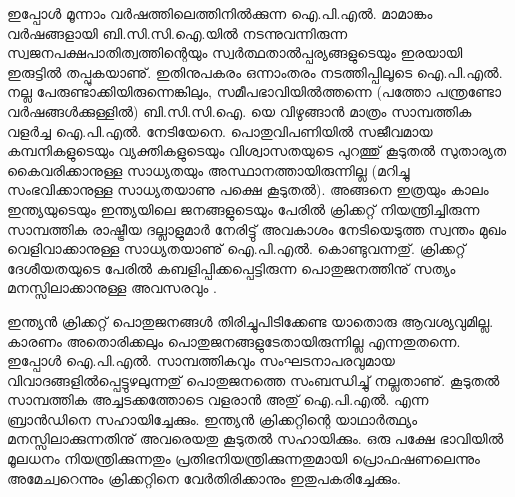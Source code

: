 ഇപ്പോള്‍ മൂന്നാം വര്‍ഷത്തിലെത്തിനില്‍ക്കുന്ന ഐ.പി.എല്‍. മാമാങ്കം വര്‍ഷങ്ങളായി ബി.സി.സി.ഐ.യില്‍ നടന്നുവന്നിരുന്ന സ്വജനപക്ഷപാതിത്വത്തിന്റെയും സ്വര്‍ത്ഥതാല്‍പ്പര്യങ്ങളുടെയും ഇരയായി ഇരുട്ടില്‍ തപ്പുകയാണു്. ഇതിനുപകരം ഒന്നാംതരം നടത്തിപ്പിലൂടെ ഐ.പി.എല്‍. നല്ല പേരുണ്ടാക്കിയിരുന്നെങ്കിലും, സമീപഭാവിയില്‍ത്തന്നെ (പത്തോ പന്ത്രണ്ടോ വര്‍ഷങ്ങള്‍ക്കുള്ളില്‍) ബി.സി.സി.ഐ. യെ വിഴുങ്ങാന്‍ മാത്രം സാമ്പത്തിക വളര്‍ച്ച ഐ.പി.എല്‍. നേടിയേനെ. പൊതുവിപണിയില്‍ സജീവമായ കമ്പനികളുടെയും വ്യക്തികളുടെയും വിശ്വാസതയുടെ പുറത്തു് കൂടുതല്‍ സുതാര്യത കൈവരിക്കാനുള്ള സാധ്യതയും അസ്ഥാനത്തായിരുന്നില്ല (മറിച്ചു സംഭവിക്കാനുള്ള സാധ്യതയാണു പക്ഷെ കൂടുതല്‍). അങ്ങനെ ഇത്രയും കാലം ഇന്ത്യയുടെയും ഇന്ത്യയിലെ ജനങ്ങളുടെയും പേരില്‍ ക്രിക്കറ്റ് നിയന്ത്രിച്ചിരുന്ന സാമ്പത്തിക രാഷ്ട്രീയ ദല്ലാളുമാര്‍ നേരിട്ടു് അവകാശം നേടിയെടുത്ത സ്വന്തം മുഖം വെളിവാക്കാനുള്ള സാധ്യതയാണു് ഐ.പി.എല്‍. കൊണ്ടുവന്നതു്. ക്രിക്കറ്റ് ദേശീയതയുടെ പേരില്‍ കബളിപ്പിക്കപ്പെട്ടിരുന്ന പൊതുജനത്തിനു് സത്യം മനസ്സിലാക്കാനുള്ള അവസരവും .

ഇന്ത്യന്‍ ക്രിക്കറ്റ് പൊതുജനങ്ങള്‍ തിരിച്ചുപിടിക്കേണ്ട യാതൊരു ആവശ്യവുമില്ല. കാരണം അതൊരിക്കലും പൊതുജനങ്ങളുടേതായിരുന്നില്ല എന്നതുതന്നെ. ഇപ്പോള്‍ ഐ.പി.എല്‍. സാമ്പത്തികവും സംഘടനാപരവുമായ വിവാദങ്ങളില്‍പ്പെട്ടുഴലുന്നതു് പൊതുജനത്തെ സംബന്ധിച്ചു് നല്ലതാണു്. കൂടുതല്‍ സാമ്പത്തിക അച്ചടക്കത്തോടെ വളരാന്‍ അതു് ഐ.പി.എല്‍. എന്ന ബ്രാന്‍ഡിനെ സഹായിച്ചേക്കും. ഇന്ത്യന്‍ ക്രിക്കറ്റിന്റെ യാഥാര്‍ത്ഥ്യം മനസ്സിലാക്കുന്നതിനു് അവരെയതു കൂടുതല്‍ സഹായിക്കും. ഒരു പക്ഷേ ഭാവിയില്‍ മൂലധനം നിയന്ത്രിക്കുന്നതും പ്രതിഭനിയന്ത്രിക്കുന്നതുമായി പ്രൊഫഷണലെന്നും അമേച്വറെന്നും ക്രിക്കറ്റിനെ വേര്‍തിരിക്കാനും ഇതുപകരിച്ചേക്കും.
\newpage
